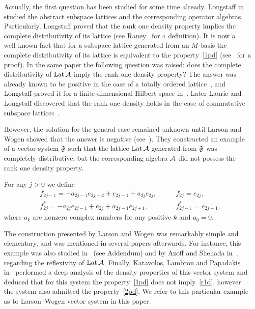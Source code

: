 \documentclass[12pt,oneside,a4paper]{amsart}
\begin{document}
  Actually, the first question has been studied for some time already.
  Long\-staff in~\cite{longstaff} studied the abstract subspace lattices and the corresponding operator algebras.
  Particularly, Longstaff proved that the rank one density property implies
    the complete distributivity of its lattice (see Raney~\cite{raney} for a definition).
  It is now a well-known fact that for a subspace lattice generated from an $M$-basis the complete distributivity of its lattice is equivalent to
    the property~\eqref{1pd} (see~\cite{argyroslambrou} for a proof).
  In the same paper the following question was raised: does the complete distributivity of $\lattice$ imply the rank one density property?
  The answer was already known to be positive in the case of a totally ordered lattice~\cite{erdos}, and
    Longstaff proved it for a finite-dimensional Hilbert space in~\cite{longstaff}.
  Later Laurie and Longstaff discovered that the rank one density holds in the case of commutative subspace lattices~\cite{laurielongstaff}.

  However, the solution for the general case remained unknown until Larson and Wogen showed that the answer is negative (see~\cite{larson}).
  They constructed an example of a vector system $\fsys$ such that the lattice $\lattice$ generated from $\fsys$
    was completely distributive, but the corresponding algebra $\cal{A}$
    did not possess the rank one density property.
  \begin{example}
    \label{lw-sys}
    For any $j > 0$ we define
    \begin{align*}
      &f_{2j-1}=-a_{2j-1}e_{2j-2} + e_{2j-1} + a_{2j}e_{2j}, \qquad &f_{2j}=e_{2j},\\
      &f^*_{2j}=-a_{2j}e_{2j-1}+e_{2j}+a_{2j+1}e_{2j+1}, \qquad &f^*_{2j-1}=e_{2j-1},
    \end{align*}
    where $a_k$ are nonzero complex numbers for any positive $k$ and $a_0 = 0$.
  \end{example}
  The construction presented by Larson and Wogen was remarkably simple and elementary, and was mentioned in several papers afterwards.
  For instance, this example was also studied in~\cite{argyroslambrou} (see Addendum) and by Azoff and Shehada in~\cite{azoff}, regarding
    the reflexivity of $\lattice$.
  Finally, Katavolos, Lambrou and Papadakis in~\cite{katavolos} performed a deep analysis of the density properties
    of this vector system and deduced that for this system the property~\eqref{1pd} does not imply~\eqref{r1d},
    however the system also admitted the property~\eqref{2pd}.
  We refer to this particular example as to Larson--Wogen vector system in this paper.
\end{document}
